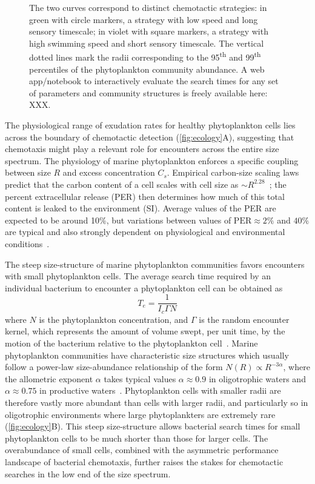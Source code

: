 \documentclass[9pt,twocolumn,twoside]{pnas-new}
\begin{document}
\begin{figure}
{        The two curves correspond to distinct chemotactic strategies: in green with circle markers, a strategy with low speed and long sensory timescale; in violet with square markers, a strategy with high swimming speed and short sensory timescale.
        The vertical dotted lines mark the radii corresponding to the 95\textsuperscript{th} and 99\textsuperscript{th} percentiles of the phytoplankton community abundance.
        {\color{magenta}A web app/notebook to interactively evaluate the search times for any set of parameters and community structures is freely available here: XXX.}
    }
    \label{fig:ecology}
\end{figure}



The physiological range of exudation rates for healthy phytoplankton cells lies across the boundary of chemotactic detection (\autoref{fig:ecology}A), suggesting that chemotaxis might play a relevant role for encounters across the entire size spectrum. The physiology of marine phytoplankton enforces a specific coupling between size $R$ and excess concentration $C_s$.
Empirical carbon-size scaling laws predict that the carbon content of a cell scales with cell size as $\sim R^{2.28}$~\cite{mullin1966relationship}; the percent extracellular release (PER) then determines how much of this total content is leaked to the environment (SI).
Average values of the PER are expected to be around 10\%, but variations between values of $\mathrm{PER}\approx 2\%$ and $40\%$ are typical and also strongly dependent on physiological and environmental conditions~\cite{maranon2004significance}.


The steep size-structure of marine phytoplankton communities favors encounters with small phytoplankton cells.
The average search time required by an individual bacterium to encounter a phytoplankton cell can be obtained as
\begin{equation}\label{eq:search_time}
    T_e = \dfrac{1}{I_c \Gamma N}
\end{equation}
where $N$ is the phytoplankton concentration, and $\Gamma$ is the random encounter kernel, which represents the amount of volume swept, per unit time, by the motion of the bacterium relative to the phytoplankton cell~\cite{kiorboe2008mechanistic,slomka2023encounter}.
Marine phytoplankton communities have characteristic size structures which usually follow a power-law size-abundance relationship of the form $N(R) \propto R^{-3\alpha}$, where the allometric exponent $\alpha$ takes typical values $\alpha\approx0.9$ in oligotrophic waters and $\alpha\approx0.75$ in productive waters~\cite{cermeno2008species}.
Phytoplankton cells with smaller radii are therefore vastly more abundant than cells with larger radii, and particularly so in oligotrophic environments where large phytoplankters are extremely rare (\autoref{fig:ecology}B).
This steep size-structure allows bacterial search times for small phytoplankton cells to be much shorter than those for larger cells.
The overabundance of small cells, combined with the asymmetric performance landscape of bacterial chemotaxis, further raises the stakes for chemotactic searches in the low end of the size spectrum.
\end{document}
